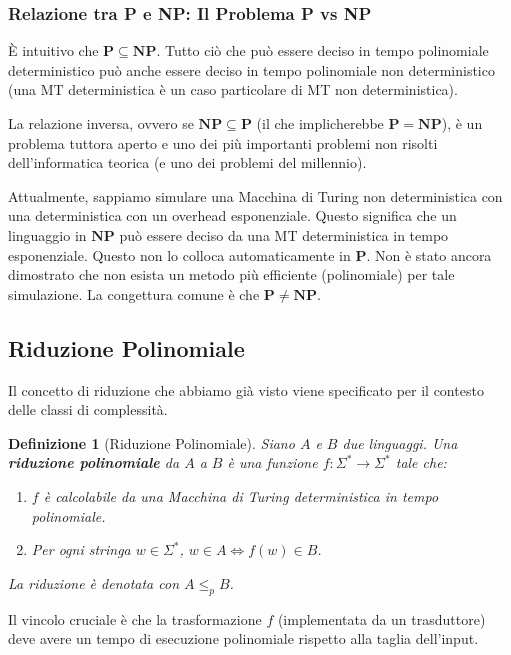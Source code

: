 \documentclass[a4paper]{article}
\newtheorem{definition}{Definizione}
\begin{document}
\subsubsection{Relazione tra P e NP: Il Problema P vs NP}

È intuitivo che $\mathbf{P} \subseteq \mathbf{NP}$. Tutto ciò che può essere deciso in tempo polinomiale deterministico può anche essere deciso in tempo polinomiale non deterministico (una MT deterministica è un caso particolare di MT non deterministica).

La relazione inversa, ovvero se $\mathbf{NP} \subseteq \mathbf{P}$ (il che implicherebbe $\mathbf{P} = \mathbf{NP}$), è un problema tuttora aperto e uno dei più importanti problemi non risolti dell'informatica teorica (e uno dei problemi del millennio).

Attualmente, sappiamo simulare una Macchina di Turing non deterministica con una deterministica con un overhead esponenziale. Questo significa che un linguaggio in $\mathbf{NP}$ può essere deciso da una MT deterministica in tempo esponenziale. Questo non lo colloca automaticamente in $\mathbf{P}$. Non è stato ancora dimostrato che non esista un metodo più efficiente (polinomiale) per tale simulazione. La congettura comune è che $\mathbf{P} \ne \mathbf{NP}$.

\subsection{Riduzione Polinomiale}

Il concetto di riduzione che abbiamo già visto viene specificato per il contesto delle classi di complessità.

\begin{definition}[Riduzione Polinomiale]
Siano $A$ e $B$ due linguaggi. Una \textbf{riduzione polinomiale} da $A$ a $B$ è una funzione $f: \Sigma^* \to \Sigma^*$ tale che:
\begin{enumerate}
    \item $f$ è calcolabile da una Macchina di Turing deterministica in tempo polinomiale.
    \item Per ogni stringa $w \in \Sigma^*$, $w \in A \iff f(w) \in B$.
\end{enumerate}
La riduzione è denotata con $A \le_p B$.
\end{definition}
Il vincolo cruciale è che la trasformazione $f$ (implementata da un trasduttore) deve avere un tempo di esecuzione polinomiale rispetto alla taglia dell'input.
\end{document}
